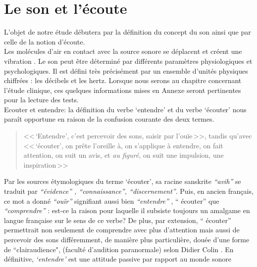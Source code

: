 
\section{Le son et l'écoute}

L'objet de notre étude débutera par la définition du concept du son ainsi que par celle de la notion 
d'écoute.
\\
Les molécules d'air en contact avec la source sonore se déplacent et
créent une vibration \autocite {bencivelli:pourquoi,}.
Le son peut être déterminé par différents paramètres
physiologiques et psychologiques.
Il est défini très précisément par un ensemble d'unités physiques chiffrées
: les décibels  et les hertz. 
Lorsque nous serons au chapitre concernant l'étude clinique,
ces quelques informations mises en Annexe seront pertinentes pour la lecture des tests.
\\
Ecouter et entendre: la définition du verbe `entendre' et du verbe `écouter'
nous paraît opportune
en raison de la confusion courante des deux termes.
\begin{quote}<<\,`Entendre', c'est  percevoir des sons, saisir par l'ouïe\,>>, tandis qu'avec
<<\,`écouter', on prête l'oreille à, on s'applique à entendre, on fait attention, on suit un avis, et \emph{au figuré}, on suit une impulsion, une inspiration\,>> \autocite[361--385]{hachette:dictionnaire} \end{quote}
Par les sources étymologiques du
terme `écouter',
 sa racine sanskrite \emph{ ``avih'' } se traduit par
 \emph{``évidence'' , ``connaissance'', ``discernement''}. Puis, en ancien
 français, ce mot a donné \textit{``ouïr''} signifiant aussi bien \textit{``entendre''} ,
`` écouter'' que \textit{``comprendre''} \autocite {etymologieWeb}:
 est-ce la raison
pour laquelle il subsiste toujours un amalgame en langue française
sur le sens de ce verbe?
De plus, par extension, `` écouter'' permettrait non seulement de comprendre avec plus d'attention
mais aussi de percevoir des sons différemment, de manière plus particulière, douée d'une forme de
``clairaudience", (faculté d'audition paranormale) selon Didier
Colin \autocite {colin2015}.
En définitive, \emph{`entendre'} est une attitude passive par rapport au monde sonore
